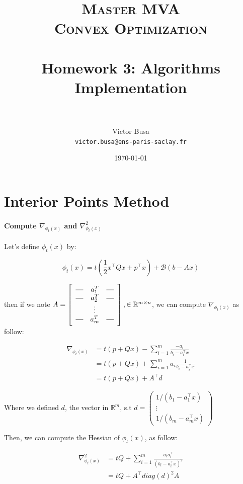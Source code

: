 \documentclass[11pt]{article}
\title{	
\normalfont \normalsize 
\textsc{Master MVA \\
Convex Optimization} \\ [20pt]
\horrule{0.5pt} \\[0.2cm] %
\textbf{Homework 3}: Algorithms Implementation \\
\horrule{2pt} \\[0.3cm] %
}
\author{Victor Busa \\
   \texttt{victor.busa@ens-paris-saclay.fr}}
\date{\normalsize\today}
\newcommand*{\horzbar}{\rule[.5ex]{2.5ex}{0.5pt}} %
\numberwithin{figure}{section} %
\begin{document}
\maketitle

\section{Interior Points Method}

\paragraph{Compute $\nabla_{\phi_t(x)}$ and $\nabla^2_{\phi_t(x)}$}

Let's define $\phi_t(x)$ by:

$$
\phi_t(x) = t\left(\frac{1}{2}x^{\intercal}Qx + p^{\intercal}x\right) + \mathcal{B}(b - Ax)
$$

then if we note $A = \left[
  \begin{array}{ccc}
    \horzbar & a^{T}_{1} & \horzbar \\
    \horzbar & a^{T}_{2} & \horzbar \\
             & \vdots    &          \\
    \horzbar & a^{T}_{m} & \horzbar
  \end{array}
\right], \in \mathbb{R}^{m \times n}$, we can compute $\nabla_{\phi_t(x)}$ as follow:

\begin{align*}
\nabla_{\phi_t(x)} &= t(p + Qx) - \sum\limits_{i=1}^m \frac{-a_i}{b_i - a^{\intercal}_i x} \\
&= t(p + Qx) + \sum\limits_{i=1}^m a_i \frac{1}{b_i - a^{\intercal}_i x} \\
&= t(p + Qx) + A^{\intercal}d
\end{align*}

Where we defined $d$, the vector in $\mathbb{R}^{m}$, s.t $d = \begin{pmatrix} 
1/(b_1 - a^{\intercal}_1 x) \\
\vdots \\
1/(b_m - a^{\intercal}_m x) 
\end{pmatrix}$

Then, we can compute the Hessian of $\phi_t(x)$, as follow:

\begin{align*}
\nabla^2_{\phi_t(x)} &= tQ + \sum\limits_{i=1}^m \frac{a_i a^{\intercal}_i}{(b_i - a^{\intercal}_i x)^2} \\
&= tQ + A^{\intercal} diag(d)^2 A
\end{align*}
\end{document}
